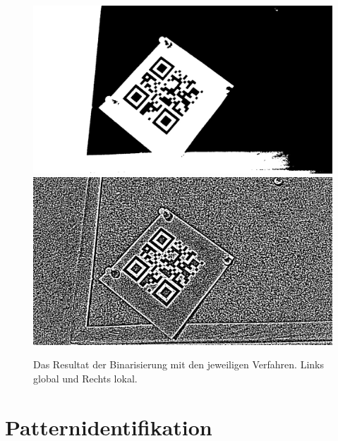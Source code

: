 \begin{figure}[h]
\caption{Das Resultat der Binarisierung mit den jeweiligen Verfahren. Links global und Rechts lokal.}
\center
\includegraphics[scale=0.15]{images/qrcode-adler-wand_1___BINARIZED___.jpg}
\hspace{5px}
\includegraphics[scale=0.15]{images/qrcode-adler-wand_2___BINARIZED___.jpg}

\end{figure}

\section{Patternidentifikation}